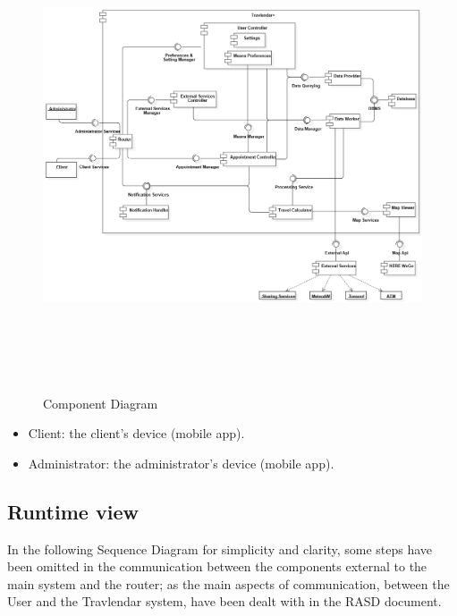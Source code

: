 \documentclass [12pt]{article}
\begin{document}
\null
{}
\begin{figure}[ht!]
\centering
\includegraphics[height=14cm, width=\linewidth]{ComponentDiagram1.jpg}
\caption{Component Diagram}
\end{figure}  
\clearpage


\begin{itemize}[•]
\item Client:  the client’s device (mobile app).
\item Administrator: the administrator’s device (mobile app).
\end{itemize}
\clearpage

\subsection{Runtime view}
In the following Sequence Diagram for simplicity and clarity, some steps have been omitted in the communication between the components external to the main system and the router; as the main aspects of communication, between the User and the Travlendar system, have been dealt with in the RASD document.

\null
{}
\end{document}
